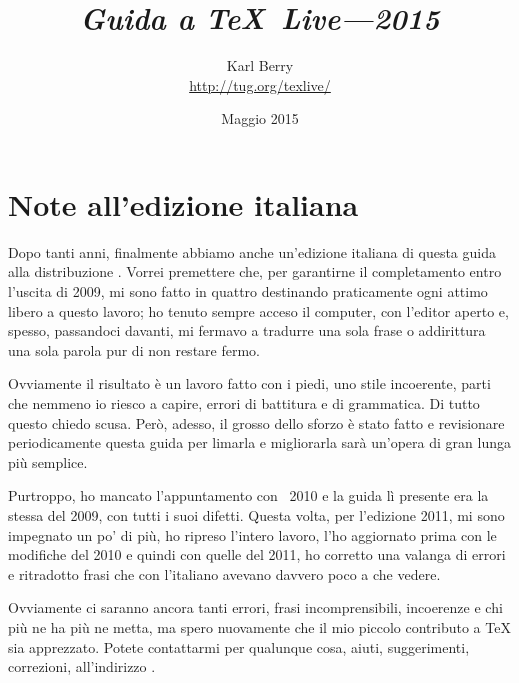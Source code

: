 \documentclass{article}
\begin{document}
\title{%
  {\huge \textit{Guida a \TeX\ Live---2015}}
}

\author{Karl Berry\\[3mm]
        \url{http://tug.org/texlive/}
       }

\date{Maggio 2015}

\maketitle

\begin{multicols}{2}
\tableofcontents
\end{multicols}


\section*{Note all'edizione italiana}

Dopo tanti anni, finalmente abbiamo anche un'edizione italiana di questa
guida alla distribuzione \TL. Vorrei premettere che, per garantirne il
completamento entro l'uscita di \TL{} 2009, mi sono fatto in quattro
destinando praticamente ogni attimo libero a questo lavoro; ho tenuto
sempre acceso il computer, con l'editor aperto e, spesso, passandoci
davanti, mi fermavo a tradurre una sola frase o addirittura una sola
parola pur di non restare fermo.

Ovviamente il risultato è un lavoro fatto con i piedi, uno stile
incoerente, parti che nemmeno io riesco a capire, errori di battitura e di
grammatica. Di tutto questo chiedo scusa. Però, adesso, il grosso dello
sforzo è stato fatto e revisionare periodicamente questa guida per limarla
e migliorarla sarà un'opera di gran lunga più semplice.

Purtroppo, ho mancato l'appuntamento con \TL\ 2010 e la guida lì presente
era la stessa del 2009, con tutti i suoi difetti. Questa volta, per
l'edizione 2011, mi sono impegnato un po' di più, ho ripreso l'intero
lavoro, l'ho aggiornato prima con le modifiche del 2010 e quindi con quelle
del 2011, ho corretto una valanga di errori e ritradotto frasi che con
l'italiano avevano davvero poco a che vedere.

Ovviamente ci saranno ancora tanti errori, frasi incomprensibili, incoerenze
e chi più ne ha più ne metta, ma spero nuovamente che il mio piccolo
contributo a \TeX{} sia apprezzato. Potete contattarmi per qualunque cosa,
aiuti, suggerimenti, correzioni, all'indirizzo
.
\end{document}
